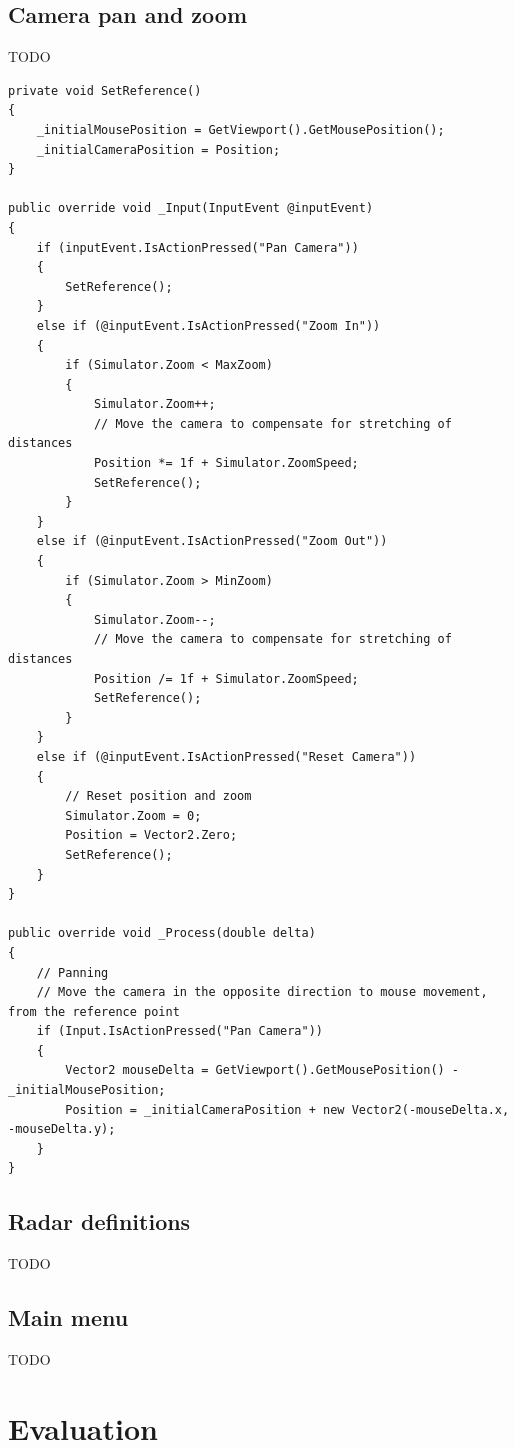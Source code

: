 \documentclass{article}
\begin{document}
\subsection{Camera pan and zoom}
TODO
\begin{lstlisting}[caption=Camera pan and zoom]
private void SetReference()
{
    _initialMousePosition = GetViewport().GetMousePosition();
    _initialCameraPosition = Position;
}

public override void _Input(InputEvent @inputEvent)
{
    if (inputEvent.IsActionPressed("Pan Camera"))
    {
        SetReference();
    }
    else if (@inputEvent.IsActionPressed("Zoom In"))
    {
        if (Simulator.Zoom < MaxZoom)
        {
            Simulator.Zoom++;
            // Move the camera to compensate for stretching of distances
            Position *= 1f + Simulator.ZoomSpeed;
            SetReference();
        }
    }
    else if (@inputEvent.IsActionPressed("Zoom Out"))
    {
        if (Simulator.Zoom > MinZoom)
        {
            Simulator.Zoom--;
            // Move the camera to compensate for stretching of distances
            Position /= 1f + Simulator.ZoomSpeed;
            SetReference();
        }
    }
    else if (@inputEvent.IsActionPressed("Reset Camera"))
    {
        // Reset position and zoom
        Simulator.Zoom = 0;
        Position = Vector2.Zero;
        SetReference();
    }
}

public override void _Process(double delta)
{
    // Panning
    // Move the camera in the opposite direction to mouse movement, from the reference point
    if (Input.IsActionPressed("Pan Camera"))
    {
        Vector2 mouseDelta = GetViewport().GetMousePosition() - _initialMousePosition;
        Position = _initialCameraPosition + new Vector2(-mouseDelta.x, -mouseDelta.y);
    }
}
\end{lstlisting}


\subsection{Radar definitions}
TODO


\subsection{Main menu}
TODO


\section{Evaluation}
\end{document}

